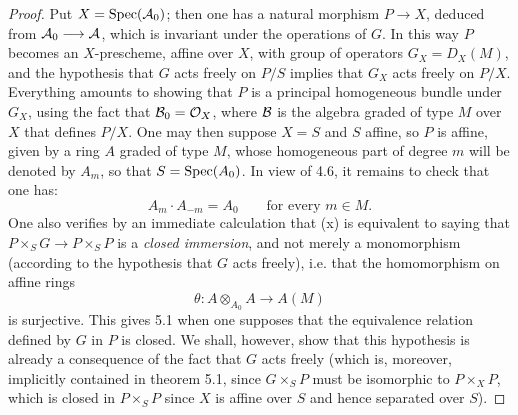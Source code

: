\begin{proof}
Put $X=\Spec(\cal A_0)$; then one has a natural morphism $P\to X$, deduced from $\cal A_0\to\cal A$, which is invariant under the operations of $G$. In this way $P$ becomes an $X$-prescheme, affine over $X$, with group of operators $G_X=D_X(M)$, and the hypothesis that $G$ acts freely on $P/S$ implies that $G_X$ acts freely on $P/X$. Everything amounts to showing that $P$ is a principal homogeneous bundle under $G_X$, using the fact that $\cal B_0=\OX$, where $\cal B$ is the algebra graded of type $M$ over $X$ that defines $P/X$. One may then suppose $X=S$ and $S$ affine, so $P$ is affine, given by a ring $A$ graded of type $M$, whose homogeneous part of degree $m$ will be denoted by $A_m$, so that $S=\Spec(A_0)$. In view of 4.6, it remains to check that one has:
\begin{equation}\tag{x}
A_m\cdot A_{-m}=A_0\qquad\text{for every }m\in M.
\end{equation}
One also verifies by an immediate calculation that (x) is equivalent to saying that $P\times_S G\to P\times_S P$ is a \emph{closed immersion}, and not merely a monomorphism (according to the hypothesis that $G$ acts freely), i.e. that the homomorphism on affine rings
\[
\theta:A\otimes_{A_0}A\to A(M)
\]
is surjective. This gives 5.1 when one supposes that the equivalence relation defined by $G$ in $P$ is closed. We shall, however, show that this hypothesis is already a consequence of the fact that $G$ acts freely (which is, moreover, implicitly contained in theorem 5.1, since $G\times_S P$ must be isomorphic to $P\times_X P$, which is closed in $P\times_S P$ since $X$ is affine over $S$ and hence separated over $S$).


\end{proof}
